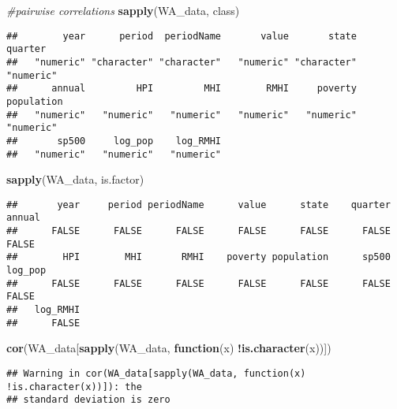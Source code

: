 \documentclass[
]{article}
\newenvironment{Shaded}{\begin{snugshade}}{\end{snugshade}}
\newcommand{\CommentTok}[1]{\textcolor[rgb]{0.56,0.35,0.01}{\textit{#1}}}
\newcommand{\ControlFlowTok}[1]{\textcolor[rgb]{0.13,0.29,0.53}{\textbf{#1}}}
\newcommand{\KeywordTok}[1]{\textcolor[rgb]{0.13,0.29,0.53}{\textbf{#1}}}
\newcommand{\NormalTok}[1]{#1}
\newcommand{\OperatorTok}[1]{\textcolor[rgb]{0.81,0.36,0.00}{\textbf{#1}}}
\begin{document}
\begin{Shaded}
\begin{Highlighting}[]
\CommentTok{#pairwise correlations}
\KeywordTok{sapply}\NormalTok{(WA_data, class)}
\end{Highlighting}
\end{Shaded}

\begin{verbatim}
##        year      period  periodName       value       state     quarter 
##   "numeric" "character" "character"   "numeric" "character"   "numeric" 
##      annual         HPI         MHI        RMHI     poverty  population 
##   "numeric"   "numeric"   "numeric"   "numeric"   "numeric"   "numeric" 
##       sp500     log_pop    log_RMHI 
##   "numeric"   "numeric"   "numeric"
\end{verbatim}

\begin{Shaded}
\begin{Highlighting}[]
\KeywordTok{sapply}\NormalTok{(WA_data, is.factor)}
\end{Highlighting}
\end{Shaded}

\begin{verbatim}
##       year     period periodName      value      state    quarter     annual 
##      FALSE      FALSE      FALSE      FALSE      FALSE      FALSE      FALSE 
##        HPI        MHI       RMHI    poverty population      sp500    log_pop 
##      FALSE      FALSE      FALSE      FALSE      FALSE      FALSE      FALSE 
##   log_RMHI 
##      FALSE
\end{verbatim}

\begin{Shaded}
\begin{Highlighting}[]
\KeywordTok{cor}\NormalTok{(WA_data[}\KeywordTok{sapply}\NormalTok{(WA_data, }\ControlFlowTok{function}\NormalTok{(x) }\OperatorTok{!}\KeywordTok{is.character}\NormalTok{(x))])}
\end{Highlighting}
\end{Shaded}

\begin{verbatim}
## Warning in cor(WA_data[sapply(WA_data, function(x) !is.character(x))]): the
## standard deviation is zero
\end{verbatim}
\end{document}
